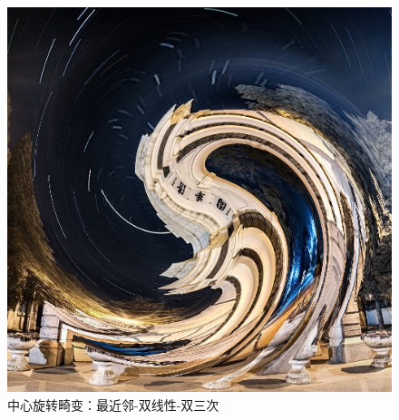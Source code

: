 \documentclass[UTF8]{ctexart}
\begin{document}
\begin{figure}[H]
    \includegraphics[scale=0.2]{images/report-images/tangent_distortionbicub.png}
    \caption{中心旋转畸变：最近邻-双线性-双三次}
\end{figure}
\end{document}
